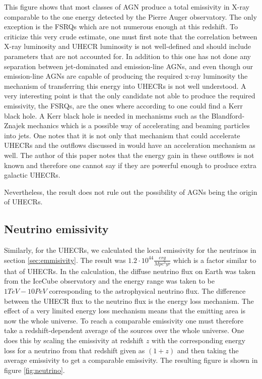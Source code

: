 This figure shows that most classes of AGN produce a total emissivity in X-ray comparable to the one energy detected by the Pierre Auger observatory. The only exception is the FSRQs which are not numerous enough at this redshift. 
To criticize this very crude estimate, one must first note that the correlation between X-ray luminosity and UHECR luminosity is not well-defined and should include parameters that are not accounted for.
In addition to this one has not done any separation between jet-dominated and emission-line AGNs, and even though our emission-line AGNs are capable of producing the required x-ray luminosity
the mechanism of transferring this energy into UHECRs is not well understood. A very interesting point is that the only candidate not able to produce the required emissivity, the FSRQs, are the ones where according to \cite{Wei-Hao_2003} one could find a Kerr black hole. 
A Kerr black hole is needed in mechanisms such as the Blandford-Znajek mechanics which is a possible way of accelerating and beaming particles into jets. One notes that it is not only that mechanism that could accelerate UHECRs and 
the outflows discussed in \cite{Laha_2021} would have an acceleration mechanism as well. The author of this paper notes that the energy gain in these outflows is not known and therefore one cannot say if they are powerful enough to produce extra galactic UHECRs. 

Nevertheless, the result does not rule out the possibility of AGNs being the origin of UHECRs. 


\subsection{Neutrino emissivity}
Similarly, for the UHECRs, we calculated the local emissivity for the neutrinos in section \ref{sec:emmisivity}. The result was $1.2 \cdot 10^{44}\frac{erg}{Mpc^3yr}$ which is a factor similar to that of UHECRs.
In the calculation, the diffuse neutrino flux on Earth was taken from the IceCube observatory \cite{Abbasi_2022} and the energy range was taken to be $1TeV - 10PeV$ corresponding to the astrophysical neutrino flux.
The difference between the UHECR flux to the neutrino flux is the energy loss mechanism. The effect of a very limited energy loss mechanism means that the emitting area is now the whole universe. To reach a comparable emissivity one must therefore take a redshift-dependent average of the sources over the whole universe.
One does this by scaling the emissivity at redshift $z$ with the corresponding energy loss for a neutrino from that redshift given as $(1+z)$ and then taking the average emissivity to get a comparable emissivity.
The resulting figure is shown in figure \ref{fig:neutrino}.

